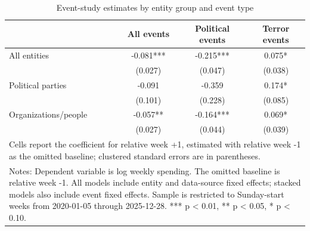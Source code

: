 \begin{table}[!htbp]
\centering
\caption{Event-study estimates by entity group and event type}
\label{tab:event_study_key_results_baseline_minus1}
\begin{tabular}{lccc}
\hline\hline
 & All events & Political events & Terror events \\
\hline
All entities & -0.081*** & -0.215*** & 0.075* \\
 & (0.027) & (0.047) & (0.038) \\
Political parties & -0.091 & -0.359 & 0.174* \\
 & (0.101) & (0.228) & (0.085) \\
Organizations/people & -0.057** & -0.164*** & 0.069* \\
 & (0.027) & (0.044) & (0.039) \\
\hline
\multicolumn{4}{l}{\footnotesize Cells report the coefficient for relative week +1, estimated with relative week -1 as the omitted baseline; clustered standard errors are in parentheses.}\\
\multicolumn{4}{l}{\footnotesize Notes: Dependent variable is log weekly spending. The omitted baseline is relative week -1. All models include entity and data-source fixed effects; stacked models also include event fixed effects. Sample is restricted to Sunday-start weeks from 2020-01-05 through 2025-12-28. *** p < 0.01, ** p < 0.05, * p < 0.10.}\\
\hline\hline
\end{tabular}
\end{table}
